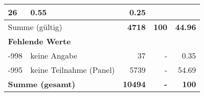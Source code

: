 \begin{longtable}{lXrrr}
       \num{26} &
       \num[round-mode=places,round-precision=2]{0.55} &
         \num[round-mode=places,round-precision=2]{0.25} \\
     \midrule
     \multicolumn{2}{l}{Summe (gültig)} &
       \textbf{\num{4718}} &
     \textbf{\num{100}} &
       \textbf{\num[round-mode=places,round-precision=2]{44.96}} \\
     \multicolumn{5}{l}{\textbf{Fehlende Werte}}\\
       -998 &
       keine Angabe &
         \num{37} &
        - &
         \num[round-mode=places,round-precision=2]{0.35} \\
       -995 &
       keine Teilnahme (Panel) &
         \num{5739} &
        - &
         \num[round-mode=places,round-precision=2]{54.69} \\
     \midrule
     \multicolumn{2}{l}{\textbf{Summe (gesamt)}} &
          \textbf{\num{10494}} &
        \textbf{-} &
        \textbf{\num{100}} \\
     \bottomrule
     \end{longtable}
     
